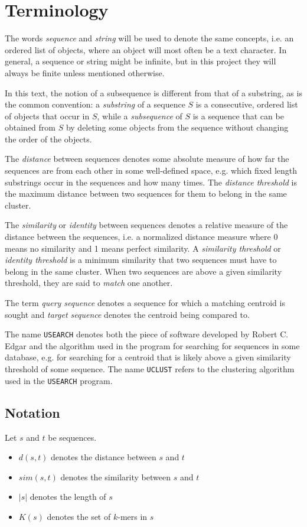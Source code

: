 \section{Terminology}

The words \emph{sequence} and \emph{string} will be used to denote the same
concepts, i.e. an ordered list of objects, where an object will most often be a
text character. In general, a sequence or string might be infinite, but in this
project they will always be finite unless mentioned otherwise.

In this text, the notion of a subsequence is different from that of a
substring, as is the common convention: a \emph{substring} of a sequence $S$ is
a consecutive, ordered list of objects that occur in $S$, while a
\emph{subsequence} of $S$ is a sequence that can be obtained from $S$ by
deleting some objects from the sequence without changing the order of the
objects.

The \emph{distance} between sequences denotes some absolute measure of how far
the sequences are from each other in some well-defined space, e.g. which fixed
length substrings occur in the sequences and how many times. The
\emph{distance threshold} is the maximum distance between two sequences for
them to belong in the same cluster.

The \emph{similarity} or \emph{identity} between sequences denotes a relative
measure of the distance between the sequences, i.e. a normalized distance
measure where \num{0} means no similarity and \num{1} means perfect similarity. A
\emph{similarity threshold} or \emph{identity threshold} is a minimum
similarity that two sequences must have to belong in the same cluster.  When
two sequences are above a given similarity threshold, they are said to
\emph{match} one another.

The term \emph{query sequence} denotes a sequence for which a matching centroid
is sought and \emph{target sequence} denotes the centroid being compared to.

The name \texttt{USEARCH} denotes both the piece of software developed by
Robert C. Edgar and the algorithm used in the program for searching for
sequences in some database, e.g. for searching for a centroid that is likely
above a given similarity threshold of some sequence. The name \texttt{UCLUST}
refers to the clustering algorithm used in the \texttt{USEARCH} program.


\subsection{Notation}

Let $s$ and $t$ be sequences.
\begin{itemize}
  \item $d(s,t)$ denotes the distance between $s$ and $t$
  \item $sim(s,t)$ denotes the similarity between $s$ and $t$
  \item $|s|$ denotes the length of $s$
  \item $K(s)$ denotes the set of $k$-mers in $s$
\end{itemize}
